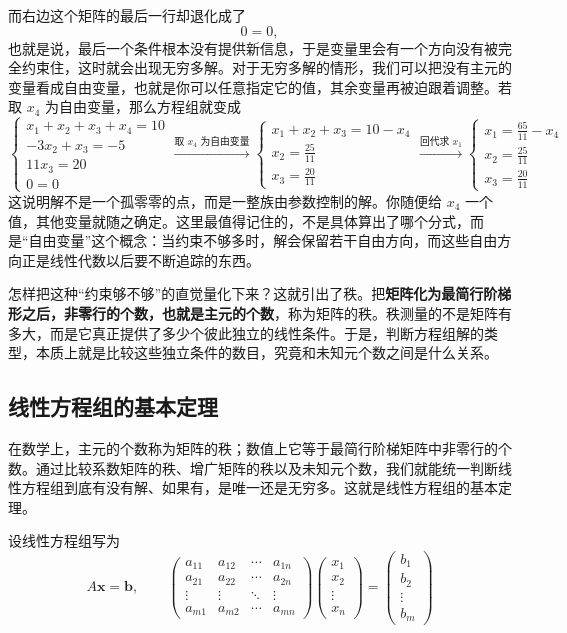 \documentclass[UTF8]{ctexbook}
\begin{document}
而右边这个矩阵的最后一行却退化成了
\[
0=0,
\]
也就是说，最后一个条件根本没有提供新信息，于是变量里会有一个方向没有被完全约束住，这时就会出现无穷多解。对于无穷多解的情形，我们可以把没有主元的变量看成自由变量，也就是你可以任意指定它的值，其余变量再被迫跟着调整。若取 $x_4$ 为自由变量，那么方程组就变成
{\renewcommand{\arraystretch}{1.45}
\[
\begin{cases}
 x_1+x_2+x_3+x_4=10\\
 -3x_2+x_3=-5\\
 11x_3=20\\
0=0
\end{cases}
\xrightarrow{\text{取 }x_4\text{ 为自由变量}}
\begin{cases}
 x_1+x_2+x_3=10-x_4\\
 x_2=\frac{25}{11}\\
 x_3=\frac{20}{11}
\end{cases}
\xrightarrow{\text{回代求 }x_1}
\begin{cases}
 x_1=\frac{65}{11}-x_4\\
 x_2=\frac{25}{11}\\
 x_3=\frac{20}{11}
\end{cases}
\]
}
这说明解不是一个孤零零的点，而是一整族由参数控制的解。你随便给 $x_4$ 一个值，其他变量就随之确定。这里最值得记住的，不是具体算出了哪个分式，而是“自由变量”这个概念：当约束不够多时，解会保留若干自由方向，而这些自由方向正是线性代数以后要不断追踪的东西。

怎样把这种“约束够不够”的直觉量化下来？这就引出了秩。把\textbf{矩阵化为最简行阶梯形之后，非零行的个数，也就是主元的个数}，称为矩阵的秩。秩测量的不是矩阵有多大，而是它真正提供了多少个彼此独立的线性条件。于是，判断方程组解的类型，本质上就是比较这些独立条件的数目，究竟和未知元个数之间是什么关系。


\subsection{线性方程组的基本定理}

在数学上，主元的个数称为矩阵的秩；数值上它等于最简行阶梯矩阵中非零行的个数。通过比较系数矩阵的秩、增广矩阵的秩以及未知元个数，我们就能统一判断线性方程组到底有没有解、如果有，是唯一还是无穷多。这就是线性方程组的基本定理。

设线性方程组写为
\[
A\mathbf{x}=\mathbf{b},\qquad
\begin{pmatrix}
a_{11} & a_{12} & \cdots & a_{1n} \\
a_{21} & a_{22} & \cdots & a_{2n} \\
\vdots & \vdots & \ddots & \vdots \\
a_{m1} & a_{m2} & \cdots & a_{mn}
\end{pmatrix}
\begin{pmatrix}x_1 \\ x_2 \\ \vdots \\ x_n\end{pmatrix}
=
\begin{pmatrix}b_1 \\ b_2 \\ \vdots \\ b_m\end{pmatrix}
\]
\end{document}
